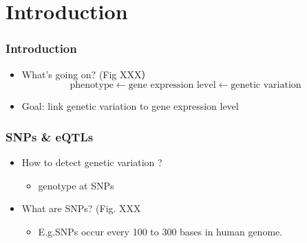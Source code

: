 \section{Introduction}
\begin{frame}
\sectionpage
\end{frame}

\begin{frame}
    \frametitle{Introduction}
    \begin{itemize}
      \item What's going on? (Fig XXX） 
      \begin{equation*}
        \text{phenotype} \leftarrow 
        \text{gene expression level} \leftarrow 
        \text{genetic variation }
      \end{equation*}


%      
\item Goal: link genetic variation to gene expression level

    \end{itemize}
\end{frame}

\begin{frame}
	\frametitle{SNPs \& eQTLs}
	\begin{itemize}
		\item How to detect genetic variation ?
		\begin{itemize}
			\item genotype at SNPs
		\end{itemize}
		\item What are SNPs? (Fig. XXX
		\begin{itemize}
			\item E.g.SNPs occur every 100 to 300 bases in human genome.
		\end{itemize}
		
	\end{itemize}
\end{frame}

